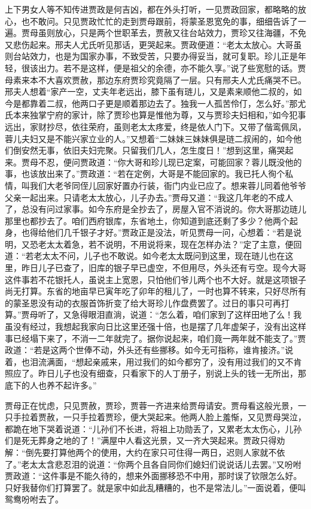 \begin{parag}
    上下男女人等不知传进贾政是何吉凶，都在外头打听，一见贾政回家，都略略的放心，也不敢问。只见贾政忙忙的走到贾母跟前，将蒙圣恩宽免的事，细细告诉了一遍。贾母虽则放心，只是两个世职革去，贾赦又往台站效力，贾珍又往海疆，不免又悲伤起来。邢夫人尤氏听见那话，更哭起来。贾政便道：“老太太放心。大哥虽则台站效力，也是为国家办事，不致受苦，只要办得妥当，就可复职。珍儿正是年轻，很该出力。若不是这样，便是祖父的余德，亦不能久享。”说了些宽慰的话。贾母素来本不大喜欢贾赦，那边东府贾珍究竟隔了一层。只有邢夫人尤氏痛哭不已。邢夫人想着“家产一空，丈夫年老远出，膝下虽有琏儿，又是素来顺他二叔的，如今是都靠着二叔，他两口子更是顺着那边去了。独我一人孤苦伶仃，怎么好。”那尤氏本来独掌宁府的家计，除了贾珍也算是惟他为尊，又与贾珍夫妇相和，”如今犯事远出，家财抄尽，依往荣府，虽则老太太疼爱，终是依人门下。又带了偕鸾佩凤，蓉儿夫妇又是不能兴家立业的人。”又想着“二妹妹三妹妹俱是琏二叔闹的，如今他们倒安然无事，依旧夫妇完聚。只留我们几人，怎生度日！”想到这里，痛哭起来。贾母不忍，便问贾政道：“你大哥和珍儿现已定案，可能回家？蓉儿既没他的事，也该放出来了。”贾政道：“若在定例，大哥是不能回家的。我已托人徇个私情，叫我们大老爷同侄儿回家好置办行装，衙门内业已应了。想来蓉儿同着他爷爷父亲一起出来。只请老太太放心，儿子办去。”贾母又道：“我这几年老的不成人了，总没有问过家事。如今东府是全抄去了，房屋入官不消说的。你大哥那边琏儿那里也都抄去了。咱们西府银库，东省地土，你知道到底还剩了多少？他两个起身，也得给他们几千银子才好。”贾政正是没法，听见贾母一问，心想着：“若是说明，又恐老太太着急，若不说明，不用说将来，现在怎样办法？”定了主意，便回道：“若老太太不问，儿子也不敢说。如今老太太既问到这里，现在琏儿也在这里，昨日儿子已查了，旧库的银子早已虚空，不但用尽，外头还有亏空。现今大哥这件事若不花银托人，虽说主上宽恩，只怕他们爷儿两个也不大好。就是这项银子尚无打算。东省的地亩早已寅年吃了卯年的租儿了，一时也算不转来，只好尽所有的蒙圣恩没有动的衣服首饰折变了给大哥珍儿作盘费罢了。过日的事只可再打算。”贾母听了，又急得眼泪直淌，说道：“怎么着，咱们家到了这样田地了么！我虽没有经过，我想起我家向日比这里还强十倍，也是摆了几年虚架子，没有出这样事已经塌下来了，不消一二年就完了。据你说起来，咱们竟一两年就不能支了。”贾政道：“若是这两个世俸不动，外头还有些挪移。如今无可指称，谁肯接济。”说着，也泪流满面，“想起亲戚来，用过我们的如今都穷了，没有用过我们的又不肯照应了。昨日儿子也没有细查，只看家下的人丁册子，别说上头的钱一无所出，那底下的人也养不起许多。”
\end{parag}


\begin{parag}
    贾母正在忧虑，只见贾赦，贾珍，贾蓉一齐进来给贾母请安。贾母看这般光景，一只手拉着贾赦，一只手拉着贾珍，便大哭起来。他两人脸上羞惭，又见贾母哭泣，都跪在地下哭着说道：“儿孙们不长进，将祖上功勋丢了，又累老太太伤心，儿孙们是死无葬身之地的了！”满屋中人看这光景，又一齐大哭起来。贾政只得劝解：“倒先要打算他两个的使用，大约在家只可住得一两日，迟则人家就不依了。”老太太含悲忍泪的说道：“你两个且各自同你们媳妇们说说话儿去罢。”又吩咐贾政道：“这件事是不能久待的，想来外面挪移恐不中用，那时误了钦限怎么好。只好我替你们打算罢了。就是家中如此乱糟糟的，也不是常法儿。”一面说着，便叫鸳鸯吩咐去了。
\end{parag}



